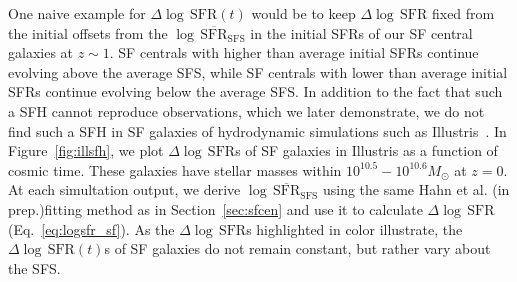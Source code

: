 \documentclass[12pt, letterpaper, preprint]{aastex}
\newcommand{\logsfr}{\log \, \mathrm{SFR}}
\newcommand{\musfms}{\log\,\overline{\mathrm{SFR}}_\mathrm{SFS}}
\newcommand{\hahngmm}{Hahn et al. (in prep.)}
\begin{document}
One naive example for $\Delta \logsfr(t)$ would be to keep 
$\Delta \logsfr$ fixed from the initial offsets from the $\musfms$
in the initial SFRs of our SF central galaxies at $z\sim1$.
SF centrals with higher than average initial SFRs continue evolving 
above the average SFS, while SF centrals with lower than average 
initial SFRs continue evolving below the average SFS. In addition to 
the fact that such a SFH cannot reproduce observations, which we later 
demonstrate, we do not find such a SFH in SF galaxies of hydrodynamic 
simulations such as Illustris~\cite{vogelsberger2014,genel2014}. 
In Figure~\ref{fig:illsfh}, we plot $\Delta \logsfr$s of SF galaxies 
in Illustris as a function of cosmic time. These galaxies have stellar 
masses within $10^{10.5}-10^{10.6}M_\odot$ at $z=0$. At each simultation 
output, we derive $\musfms$ using the same \hahngmm fitting method as in
Section~\ref{sec:sfcen} and use it to calculate $\Delta \logsfr$ 
(Eq.~\ref{eq:logsfr_sf}). As the $\Delta \logsfr$s highlighted in color 
illustrate, the $\Delta \logsfr(t)$s of SF galaxies do not remain constant, 
but rather vary about the SFS. 
\end{document}
